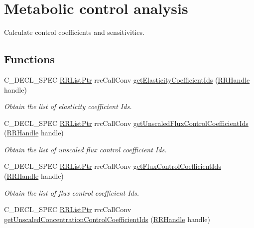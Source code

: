 \hypertarget{group__mca}{\section{Metabolic control analysis}
\label{group__mca}
}


Calculate control coefficients and sensitivities.  


\subsection*{Functions}
\begin{DoxyCompactItemize}
\item 
C\-\_\-\-D\-E\-C\-L\-\_\-\-S\-P\-E\-C \hyperlink{rrc__types_8h_a32a8a60ac06858ff3a791672bd2bec73}{R\-R\-List\-Ptr} rrc\-Call\-Conv \hyperlink{group__mca_ga344045fc1136134e90c716343ac06f9a}{get\-Elasticity\-Coefficient\-Ids} (\hyperlink{rrc__types_8h_a1d68f0592372208fa5a5f2799ea4b3ae}{R\-R\-Handle} handle)
\begin{DoxyCompactList}\small\item\em Obtain the list of elasticity coefficient Ids. \end{DoxyCompactList}\item 
C\-\_\-\-D\-E\-C\-L\-\_\-\-S\-P\-E\-C \hyperlink{rrc__types_8h_a32a8a60ac06858ff3a791672bd2bec73}{R\-R\-List\-Ptr} rrc\-Call\-Conv \hyperlink{group__mca_gaaaf6b7d6da161d1a64fea9e0ce9c2843}{get\-Unscaled\-Flux\-Control\-Coefficient\-Ids} (\hyperlink{rrc__types_8h_a1d68f0592372208fa5a5f2799ea4b3ae}{R\-R\-Handle} handle)
\begin{DoxyCompactList}\small\item\em Obtain the list of unscaled flux control coefficient Ids. \end{DoxyCompactList}\item 
C\-\_\-\-D\-E\-C\-L\-\_\-\-S\-P\-E\-C \hyperlink{rrc__types_8h_a32a8a60ac06858ff3a791672bd2bec73}{R\-R\-List\-Ptr} rrc\-Call\-Conv \hyperlink{group__mca_ga3031fcbb6954adaa81ac6f8574c5dc33}{get\-Flux\-Control\-Coefficient\-Ids} (\hyperlink{rrc__types_8h_a1d68f0592372208fa5a5f2799ea4b3ae}{R\-R\-Handle} handle)
\begin{DoxyCompactList}\small\item\em Obtain the list of flux control coefficient Ids. \end{DoxyCompactList}\item 
C\-\_\-\-D\-E\-C\-L\-\_\-\-S\-P\-E\-C \hyperlink{rrc__types_8h_a32a8a60ac06858ff3a791672bd2bec73}{R\-R\-List\-Ptr} rrc\-Call\-Conv \hyperlink{group__mca_ga869f3496c8a786a1af0018cf9a98ec16}{get\-Unscaled\-Concentration\-Control\-Coefficient\-Ids} (\hyperlink{rrc__types_8h_a1d68f0592372208fa5a5f2799ea4b3ae}{R\-R\-Handle} handle)

\end{DoxyCompactItemize}
